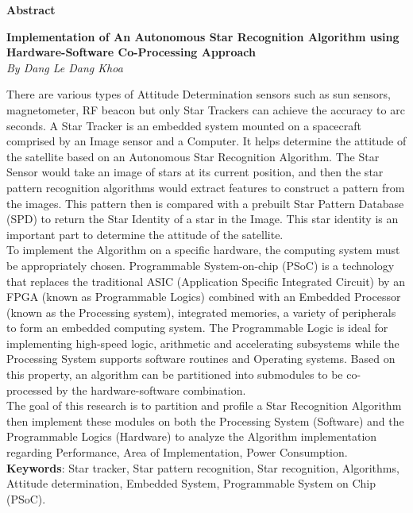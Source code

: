 \begin{center}
	\textbf{\large Abstract}
\end{center}

\begin{center}
	\textbf{Implementation of An Autonomous Star Recognition Algorithm using Hardware-Software Co-Processing Approach} \\
	\emph{By Dang Le Dang Khoa}
\end{center}

\noindent There are various types of Attitude Determination sensors such as sun sensors, magnetometer, RF beacon but only Star Trackers can achieve the accuracy to arc seconds. A Star Tracker is an embedded system mounted on a spacecraft comprised by an Image sensor and a Computer. It helps determine the attitude of the satellite based on an Autonomous Star Recognition Algorithm. The Star Sensor would take an image of stars at its current position, and then the star pattern recognition algorithms would extract features to construct a pattern from the images. This pattern then is compared with a prebuilt Star Pattern Database (SPD) to return the Star Identity of a star in the Image. This star identity is an important part to determine the attitude of the satellite. \\

\noindent To implement the Algorithm on a specific hardware, the computing system must be appropriately chosen. Programmable System-on-chip (PSoC) is a technology that replaces the traditional ASIC (Application Specific Integrated Circuit) by an FPGA (known as Programmable Logics) combined with an Embedded Processor (known as the Processing system), integrated memories, a variety of peripherals to form an embedded computing system. The Programmable Logic is ideal for implementing high-speed logic, arithmetic and accelerating subsystems while the Processing System supports software routines and Operating systems. Based on this property, an algorithm can be partitioned into submodules to be co-processed by the hardware-software combination. \\

\noindent The goal of this research is to partition and profile a Star Recognition Algorithm then implement these modules on both the Processing System (Software) and the Programmable Logics (Hardware) to analyze the Algorithm implementation regarding Performance, Area of Implementation, Power Consumption. \\

\noindent \textbf{Keywords}: Star tracker, Star pattern recognition, Star recognition, Algorithms, Attitude determination, Embedded System, Programmable System on Chip (PSoC).
